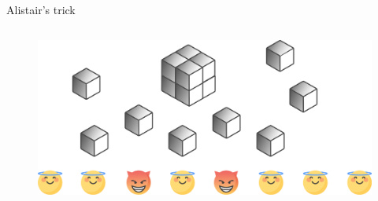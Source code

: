 \documentclass[final]{beamer}
\newlength{\onecolwid}
\newlength{\twocolwid}
\begin{document}
\begin{frame}[t]
\begin{columns}[t]
\begin{column}{\twocolwid}
\begin{columns}[t,totalwidth=\twocolwid]
\begin{column}{\onecolwid}
\begin{block}{Alistair's trick}
\end{block}


\end{column} %

\end{columns} %



\begin{alertblock}{}
\begin{figure}
\includegraphics[width=0.8\linewidth]{rob-image1.png}
\end{figure}
\end{alertblock} 



\begin{columns}[t,totalwidth=\twocolwid] %

\begin{column}{\onecolwid} %



\end{column}
\end{columns}
\end{column}
\end{columns}
\end{frame}
\end{document}
